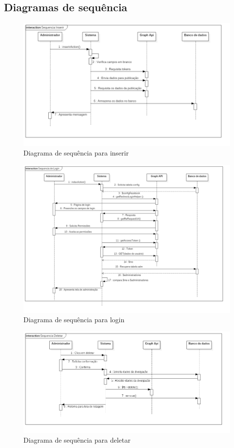 \subsection{Diagramas de sequência}
\begin{figure}[H]
    \centering
    \includegraphics[width=\textwidth]{figuras/sequenciainserir}
    \caption{Diagrama de sequência para inserir}
\end{figure}

\begin{figure}[H]
    \centering
    \includegraphics[width=\textwidth]{figuras/sequencialogin}
    \caption{Diagrama de sequência para login}
\end{figure}

\begin{figure}[H]
    \centering
    \includegraphics[width=\textwidth]{figuras/sequenciaDeletar}
    \caption{Diagrama de sequência para deletar}
\end{figure}

